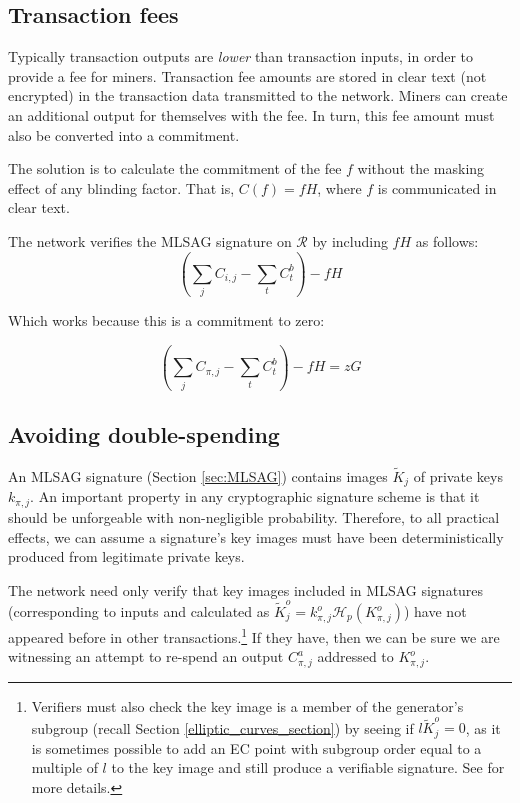 \subsection{Transaction fees}

Typically transaction outputs are {\em lower} than transaction inputs, in order to provide a fee for miners. Transaction fee amounts are stored in clear text (not encrypted) in the transaction data transmitted to the network. Miners can create an additional output for themselves with the fee. In turn, this fee amount must also be converted into a commitment.

The solution is to calculate the commitment of the fee $f$ without the masking effect of any blinding factor. That is, $C(f) = f H$, where $f$ is communicated in clear text.

The network verifies the MLSAG signature on $\mathcal{R}$ by including $f H$ as follows:\\
\[ (\sum\limits_j C_{i, j} - \sum\limits_t C^b_{t}) - f H\]

Which works because this is a commitment to zero:

\[ (\sum\limits_j C_{\pi, j} - \sum\limits_t C^b_{t}) - f H = z G\]

\subsection{Avoiding double-spending}

An MLSAG signature (Section \ref{sec:MLSAG}) contains images \(\tilde{K}_{j}\) of private keys \(k_{\pi, j}\). An important property in any cryptographic signature scheme is that it should be unforgeable with non-negligible probability. Therefore, to all practical effects, we can assume a signature’s key images must have been deterministically produced from legitimate private keys.
	
The network need only verify that key images included in MLSAG signatures (corresponding to inputs and calculated as $\tilde{K}^o_{j} = k^o_{\pi,j} \mathcal{H}_p(K^o_{\pi,j})$) have not appeared before in other transactions.\footnote{Verifiers must also check the key image is a member of the generator's subgroup (recall Section \ref{elliptic_curves_section}) by seeing if $l \tilde{K}^o_{j} = 0$, as it is sometimes possible to add an EC point with subgroup order equal to a multiple of $l$ to the key image and still produce a verifiable signature. See \cite{key-image-bug} for more details.} If they have, then we can be sure we are witnessing an attempt to re-spend an output $C^a_{\pi,j}$ addressed to $K_{\pi,j}^o$.

